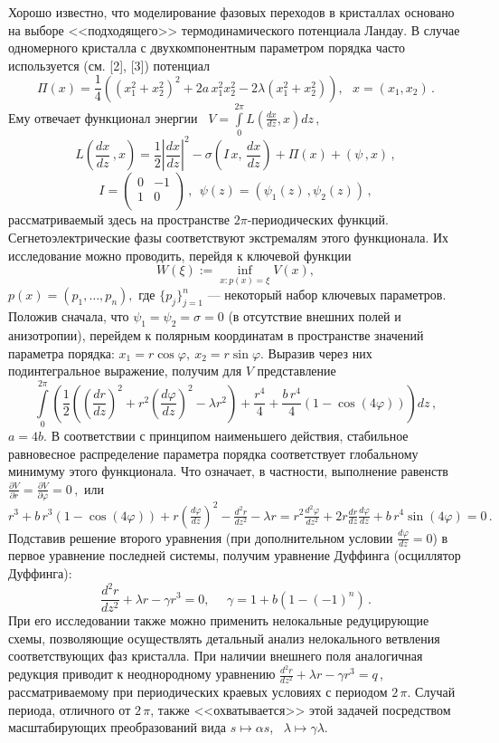 Хорошо известно, что моделирование фазовых переходов в кристаллах
основано на выборе <<подходящего>> термодинамического потенциала
Ландау. В случае одномерного кристалла с двухкомпонентным параметром
порядка часто используется (см. [2], [3]) потенциал
 $$
\Pi(x) = \frac14 \left((x_1^2+x_2^2)^2+ 2a\,x_1^2x_2^2 -
2\lambda(x_1^2+x_2^2)\right), \ \ \  x =(x_1,x_2)\,.
 $$
Ему отвечает функционал энергии  \ $V =
\int\limits_0^{2\pi}L(\frac{d x}{d z},x)dz\,,$
 $$
L\left(\frac{d x}{d z}\,,x\right) = \frac12 \left|\frac{d x}{d
z}\right|^2- \sigma\left(I\,x,\,\frac{d x}{d z}\right) + \Pi(x) +
(\psi\,, x)\,,
 $$
 $$
I= \left(
    \begin{array}{cc}
    0 &- 1\\
   1 &  0\\
    \end{array}
    \right)\,,
\ \ \psi(z) =(\psi_1(z)\,, \psi_2(z))\,,
 $$
рассматриваемый здесь на пространстве $2\pi$-периодических функций.
Сегнетоэлектрические фазы соответствуют экстремалям этого
функционала. Их исследование можно проводить, перейдя к ключевой
функции
 $$
W(\xi):=\inf_{x:p(x)=\xi} V(x),
 $$
$p(x)=(p_1,\dots,p_n),$ где $\{p_j\}_{j=1}^n$ --- некоторый набор
ключевых параметров. Положив сначала, что $\psi_1 = \psi_2 =\sigma =
0$ (в отсутствие внешних полей и анизотропии), перейдем к полярным
координатам в пространстве значений параметра порядка:
 $
x_1=r\cos\varphi,\ x_2=r\sin\varphi.
 $
Выразив через них подинтегральное выражение, получим для $V$
представление
 {\footnotesize
 $$
\int\limits_0^{2\pi} \left(\frac12\left(\left(\frac{d r}{d
z}\right)^2 + r^2\left(\frac{d \varphi}{d z}\right)^2-\lambda r^2
\right) + \frac{r^4}4 +\frac{b\,r^4}4(1-\cos( 4\varphi))\right)dz\,,
 $$}
$a=4b$. В соответствии с принципом наименьшего действия, стабильное
равновесное распределение параметра порядка соответствует
глобальному минимуму этого функ\-ци\-о\-на\-ла. Что означает, в
частности, выполнение равенств
 $
\frac{\partial V}{\partial r}= \frac{\partial V}{\partial \varphi}=0
\,,
 $
или
 $
r^3 + b\,r^3(1-\cos (4\varphi)) + r\left(\frac{d \varphi}{d
z}\right)^2-\frac{d^2 r}{d z^2} -\lambda r = r^2\frac{d^2\varphi}{d
z^2} + 2r\frac{d r}{d z}\frac{d \varphi}{d z} + b\,r^4\sin(
4\varphi) = 0\,.
 $
Подставив решение второго уравнения (при дополнительном условии $
\frac{d \varphi}{d z}=0$) в первое уравнение последней системы,
получим уравнение Дуффинга (осциллятор Дуффинга):
 $$
 \frac{d^2 r}{d z^2} + \lambda r - \gamma  r^3=0, \
 \ \ \ \ \  \gamma = 1+b\left(1-(-1)^n\right)\,.
 $$
При его исследовании также можно применить нелокальные редуцирующие
схемы, позволяющие осуществлять детальный анализ нелокального
ветвления соответствующих фаз кристалла. При наличии внешнего поля
аналогичная редукция приводит к неоднородному уравнению
 $
\frac{d^2 r}{d z^2} + \lambda r - \gamma r^3=q\,,
 $
рассматриваемому при периодических краевых условиях с периодом
$2\,\pi$. Случай периода, отличного от $2\,\pi$, также
<<охватывается>> этой задачей посредством масштабирующих
преобразований вида $s\longmapsto \alpha s$, \ $\lambda\longmapsto
\gamma \lambda$.

